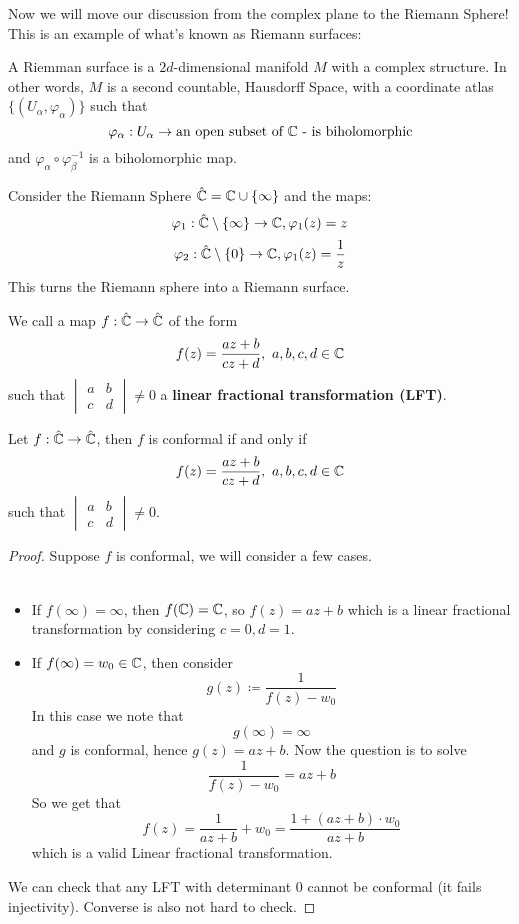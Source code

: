 Now we will move our discussion from the complex plane to the Riemann Sphere! This is an example of what's known as Riemann surfaces:

\begin{definition}
    A Riemman surface is a $2d$-dimensional manifold $M$ with a complex structure. In other words, $M$ is a second countable, Hausdorff Space, with a coordinate atlas $\{(U_\alpha, \varphi_\alpha)\}$ such that
    \[\varphi_\alpha: U_\alpha \to \text{an open subset of $\mathbb{C}$ - is biholomorphic}\]
    and $\varphi_\alpha \circ \varphi_\beta^{-1}$ is a biholomorphic map.
\end{definition}

\begin{example}
    Consider the Riemann Sphere $\hat{\mathbb{C}} = \mathbb{C} \cup \{\infty\}$ and the maps:
    \[\varphi_1: \hat{\mathbb{C}} \setminus \{\infty\} \to \mathbb{C}, \varphi_1(z) = z\]
    \[\varphi_2: \hat{\mathbb{C}} \setminus \{0\} \to \mathbb{C}, \varphi_1(z) = \frac{1}{z}\]
    This turns the Riemann sphere into a Riemann surface.
\end{example}

\begin{definition}
    We call a map $f: \hat{\mathbb{C}} \to \hat{\mathbb{C}}$ of the form
    \[f(z) = \frac{az + b}{cz + d},\ a, b, c, d \in \mathbb{C}\]
    such that $\begin{vmatrix} a & b\\ c & d\end{vmatrix} \neq 0$ a \textbf{linear fractional transformation (LFT)}.
\end{definition}

\begin{theorem}
    Let $f: \hat{\mathbb{C}} \to \hat{\mathbb{C}}$, then $f$ is conformal if and only if
    \[f(z) = \frac{az + b}{cz + d},\ a, b, c, d \in \mathbb{C}\]
    such that $\begin{vmatrix} a & b\\ c & d\end{vmatrix} \neq 0$.
\end{theorem}

\begin{proof}
    Suppose $f$ is conformal, we will consider a few cases.\\\\
    \begin{itemize}
        \item If $f(\infty) = \infty$, then $f(\mathbb{C}) = \mathbb{C}$, so $f(z) = az + b$ which is a linear fractional transformation by considering $c = 0, d = 1$.
        \item If $f(\infty) = w_0 \in \mathbb{C}$, then consider
        \[g(z) \coloneqq \frac{1}{f(z) - w_0}\]
        In this case we note that
        \[g(\infty) = \infty\]
        and $g$ is conformal, hence $g(z) = az + b$. Now the question is to solve
        \[\frac{1}{f(z) - w_0} = az + b\]
        So we get that
        \[f(z) = \frac{1}{az + b} + w_0 = \frac{1 + (az + b) \cdot w_0}{az + b}\]
        which is a valid Linear fractional transformation.
    \end{itemize}
    We can check that any LFT with determinant $0$ cannot be conformal (it fails injectivity). Converse is also not hard to check.
\end{proof}

